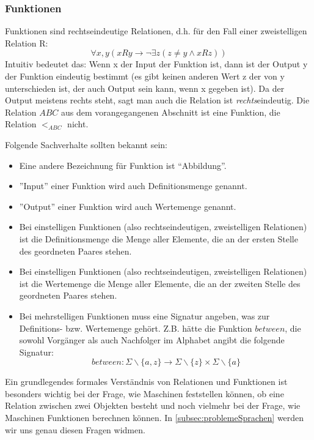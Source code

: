 \subsubsection{Funktionen}
Funktionen sind rechtseindeutige Relationen,
d.h. für den Fall einer zweistelligen Relation R:
\[
    \forall x,y (xRy \rightarrow \neg \exists z (z \neq y \wedge xRz))
\]
Intuitiv bedeutet das: Wenn x der Input der Funktion ist,
dann ist der Output y der Funktion eindeutig bestimmt
(es gibt keinen anderen Wert z der von y unterschieden ist,
der auch Output sein kann, wenn x gegeben ist).
Da der Output meistens rechts steht, sagt man auch die Relation ist \emph{rechts}eindeutig.
Die Relation $ABC$ aus dem vorangegangenen Abschnitt ist eine Funktion,
die Relation $<_{ABC}$ nicht.

Folgende Sachverhalte sollten bekannt sein:
\begin{itemize}
    \item Eine andere Bezeichnung für Funktion ist ``Abbildung''.
    \item ''Input'' einer Funktion wird auch Definitionsmenge genannt.
    \item ''Output'' einer Funktion wird auch Wertemenge genannt.
    \item Bei einstelligen Funktionen (also rechtseindeutigen, zweistelligen Relationen)
        ist die Definitionsmenge die Menge aller Elemente,
        die an der ersten Stelle des geordneten Paares stehen.
    \item Bei einstelligen Funktionen (also rechtseindeutigen, zweistelligen Relationen)
        ist die Wertemenge die Menge aller Elemente,
        die an der zweiten Stelle des geordneten Paares stehen.
    \item Bei mehrstelligen Funktionen muss eine Signatur angeben, was zur Definitions-
        bzw. Wertemenge gehört. Z.B. hätte die Funktion $between$,
        die sowohl Vorgänger als auch Nachfolger im Alphabet angibt die folgende Signatur:
        \[ between:
            \Sigma \backslash \{a,z\}
            \rightarrow
            \Sigma \backslash \{z\} \times \Sigma \backslash \{a\} \]
\end{itemize}

Ein grundlegendes formales Verständnis von Relationen und Funktionen ist besonders wichtig
bei der Frage, wie Maschinen feststellen können,
ob eine Relation zwischen zwei Objekten besteht
und noch vielmehr bei der Frage, wie Maschinen Funktionen berechnen können.
In \autoref{subsec:problemeSprachen} werden wir uns genau diesen Fragen widmen.


